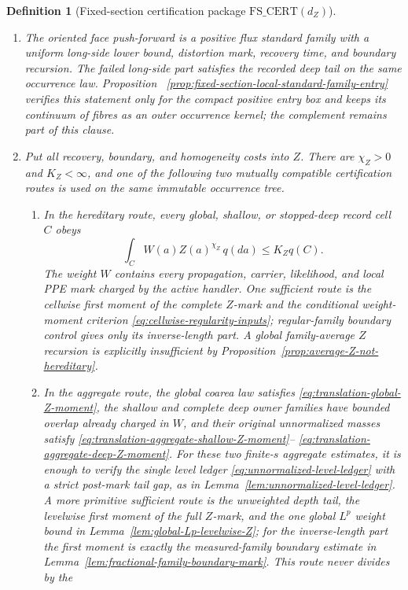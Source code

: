 \documentclass[11pt]{article}
\newtheorem{definition}[theorem]{Definition}
\begin{document}
\begin{definition}[Fixed-section certification package
$\mathrm{FS\_CERT}(d_Z)$]
\begin{enumerate}[label=\textup{(FS\arabic*)}]
\item The oriented face push-forward is a positive flux standard family
with a uniform long-side lower bound, distortion mark, recovery time, and
boundary recursion.  The failed long-side part satisfies the recorded deep
tail on the same occurrence law.  Proposition~
\ref{prop:fixed-section-local-standard-family-entry} verifies this statement
only for the compact positive entry box and keeps its continuum of fibres as
an outer occurrence kernel; the complement remains part of this clause.
\item Put all recovery, boundary, and homogeneity costs into $Z$.  There are
$\chi_Z>0$ and $K_Z<\infty$, and one of the following two mutually
compatible certification routes is used on the same immutable occurrence
tree.
\begin{enumerate}[label=\textup{(FS3\alph*)}]
\item In the hereditary route, every global, shallow, or stopped-deep record
cell $C$ obeys
\begin{equation}
 \int_C W(a)Z(a)^{\chi_Z}\,q(da)
 \le K_Z q(C).
\label{eq:fixed-section-hereditary-Z}
\end{equation}
The weight $W$ contains every propagation, carrier, likelihood, and local
PPE mark charged by the active handler.  One sufficient route is the
cellwise first moment of the complete $Z$-mark and the conditional
weight-moment criterion \eqref{eq:cellwise-regularity-inputs}; regular-family
boundary control gives only its inverse-length part.  A global family-average
$Z$ recursion is explicitly insufficient by
Proposition~\ref{prop:average-Z-not-hereditary}.
\item In the aggregate route, the global coarea law satisfies
\eqref{eq:translation-global-Z-moment}, the shallow and complete deep owner
families have bounded overlap already charged in $W$, and their original
unnormalized masses satisfy
\eqref{eq:translation-aggregate-shallow-Z-moment}--
\eqref{eq:translation-aggregate-deep-Z-moment}.  For these two finite-$s$
aggregate estimates, it is enough to verify the single level ledger
\eqref{eq:unnormalized-level-ledger} with a strict post-mark tail gap, as in
Lemma~\ref{lem:unnormalized-level-ledger}.  A more primitive sufficient
route is the unweighted depth tail, the levelwise first moment of the full
$Z$-mark, and the one global $L^p$ weight bound in
Lemma~\ref{lem:global-Lp-levelwise-Z}; for the inverse-length part the first
moment is exactly the measured-family boundary estimate in
Lemma~\ref{lem:fractional-family-boundary-mark}.  This route never divides by the

\end{enumerate}
\end{enumerate}
\end{definition}
\end{document}
